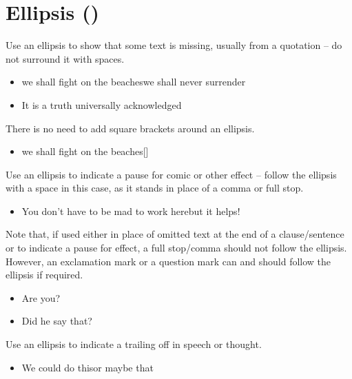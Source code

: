 \documentclass[11pt,a4paper]{book}
\newcommand{\xmark}{{\color{cadmiumred}\ding{54}}}%
\newcommand{\cmark}{{\color{green(html/cssgreen)}\checkmark}}%
\begin{document}
	\section{Ellipsis (\textellipsis)}
		Use an ellipsis to show that some text is missing, usually from a quotation -- do not surround it with spaces.
		{\firasans \begin{mdframed}[backgroundcolor=aliceblue] \begin{itemize}[label=\cmark]
			\item we shall fight on the beaches\textellipsis we shall never surrender\textellipsis 
			\item It is a truth universally acknowledged\textellipsis 
		\end{itemize} \end{mdframed} }
		There is no need to add square brackets around an ellipsis.
		{\firasans \begin{mdframed}[backgroundcolor=aliceblue] \begin{itemize}[label=\cmark]
			\item[\xmark] [\textellipsis ]we shall fight on the beaches[\textellipsis ]
		\end{itemize} \end{mdframed} }
	\newpage
		Use an ellipsis to indicate a pause for comic or other effect -- follow the ellipsis with a space in this case, as it stands in place of a comma or full stop.
		{\firasans \begin{mdframed}[backgroundcolor=aliceblue] \begin{itemize}[label=\cmark]
			\item You don't have to be mad to work here\textellipsis \space but it helps!
		\end{itemize} \end{mdframed} }
		Note that, if used either in place of omitted text at the end of a clause/sentence or to indicate a pause for effect, a full stop/comma should not follow the ellipsis. However, an exclamation mark or a question mark can and should follow the ellipsis if required.
		{\firasans \begin{mdframed}[backgroundcolor=aliceblue] \begin{itemize}[label=\cmark]
			\item Are you\textellipsis ?
			\item Did he say that\textellipsis ?
		\end{itemize} \end{mdframed} }
		Use an ellipsis to indicate a trailing off in speech or thought.
		{\firasans \begin{mdframed}[backgroundcolor=aliceblue] \begin{itemize}[label=\cmark]
			\item We could do this\textellipsis or maybe that\textellipsis 
		\end{itemize} \end{mdframed} }
\end{document}
